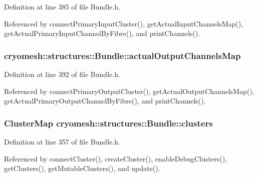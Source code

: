 \-Definition at line 385 of file \-Bundle.\-h.



\-Referenced by connect\-Primary\-Input\-Cluster(), get\-Actual\-Input\-Channels\-Map(), get\-Actual\-Primary\-Input\-Channel\-By\-Fibre(), and print\-Channels().

\hypertarget{classcryomesh_1_1structures_1_1Bundle_ac67a6d7b29b37b8927c93350e8bcf6e5}{
\subsubsection[{actual\-Output\-Channels\-Map}]{ {\bf cryomesh\-::structures\-::\-Bundle\-::actual\-Output\-Channels\-Map}}}\label{classcryomesh_1_1structures_1_1Bundle_ac67a6d7b29b37b8927c93350e8bcf6e5}


\-Definition at line 392 of file \-Bundle.\-h.



\-Referenced by connect\-Primary\-Output\-Cluster(), get\-Actual\-Output\-Channels\-Map(), get\-Actual\-Primary\-Output\-Channel\-By\-Fibre(), and print\-Channels().

\hypertarget{classcryomesh_1_1structures_1_1Bundle_a35a36d3305706f597f4c586fcd9f74b7}{
\subsubsection[{clusters}]{\setlength{\rightskip}{0pt plus 5cm}\-Cluster\-Map {\bf cryomesh\-::structures\-::\-Bundle\-::clusters}}}\label{classcryomesh_1_1structures_1_1Bundle_a35a36d3305706f597f4c586fcd9f74b7}


\-Definition at line 357 of file \-Bundle.\-h.



\-Referenced by connect\-Cluster(), create\-Cluster(), enable\-Debug\-Clusters(), get\-Clusters(), get\-Mutable\-Clusters(), and update().

